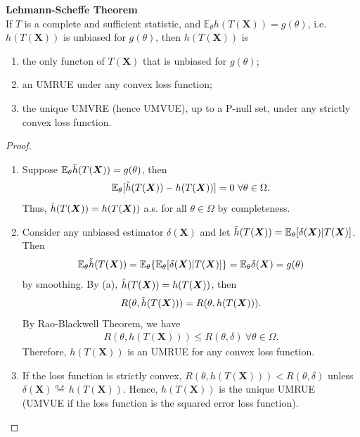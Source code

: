 \begin{theorem}
    \textbf{Lehmann-Scheff$\mathbf{\acute{e}}$ Theorem}\\
    If $T$ is a complete and sufficient statistic, and $\mathbb{E}_\theta h(T(\boldsymbol{X}))=g(\theta)$,
    i.e. $h(T(\boldsymbol{X}))$ is unbiased for $g(\theta)$,
    then $h(T(\boldsymbol{X}))$ is
    \begin{enumerate}[{(a)}]
        \item the only functon of $T(\boldsymbol{X})$ that is unbiased for $g(\theta)$;
        \item an UMRUE under any convex loss function;
        \item the unique UMVRE (hence UMVUE), up to a P-null set, 
        under any strictly convex loss function.
    \end{enumerate}
\end{theorem}
\begin{proof}
    $~$
    \begin{enumerate}[{(a)}]
        \item Suppose $\mathbb{E}_\theta\Tilde{h}(T(\boldsymbol{X}))=g(\theta)$, then
        \begin{gather}
            \mathbb{E}_\theta[\Tilde{h}(T(\boldsymbol{X}))-h(T(\boldsymbol{X}))]=0~\forall{\theta}\in\Omega.
        \end{gather}
        Thus, $\Tilde{h}(T(\boldsymbol{X}))=h(T(\boldsymbol{X}))$ a.s. 
        for all $\theta\in\Omega$ by completeness.
        \item Consider any unbiased estimator $\delta(\boldsymbol{X})$ and 
        let $\Tilde{h}(T(\boldsymbol{X}))=\mathbb{E}_\theta[\delta(\boldsymbol{X})|T(\boldsymbol{X})]$. Then
        \begin{gather}
            \mathbb{E}_\theta\Tilde{h}(T(\boldsymbol{X}))
            =\mathbb{E}_\theta\{\mathbb{E}_\theta[\delta(\boldsymbol{X})|T(\boldsymbol{X})]\}
            =\mathbb{E}_\theta\delta(\boldsymbol{X})=g(\theta)
        \end{gather}
        by smoothing. By (a), $\Tilde{h}(T(\boldsymbol{X}))=h(T(\boldsymbol{X}))$, then
        \begin{gather}
            R(\theta,\Tilde{h}(T(\boldsymbol{X})))=R(\theta,h(T(\boldsymbol{X}))).
        \end{gather}
        By Rao-Blackwell Theorem, we have 
        \begin{gather}
            R(\theta,h(T(\boldsymbol{X})))\leq R(\theta,\delta)~\forall{\theta}\in\Omega.
        \end{gather}
        Therefore, $h(T(\boldsymbol{X}))$ is an UMRUE for any convex loss function.
        \item If the loss function is strictly convex, 
        $R(\theta,h(T(\boldsymbol{X})))< R(\theta,\delta)$
        unless $\delta(\boldsymbol{X})\overset{a.s.}{=}h(T(\boldsymbol{X}))$. 
        Hence, $h(T(\boldsymbol{X}))$ is the unique UMRUE
        (UMVUE if the loss function is the squared error loss function).
    \end{enumerate}
\end{proof}

